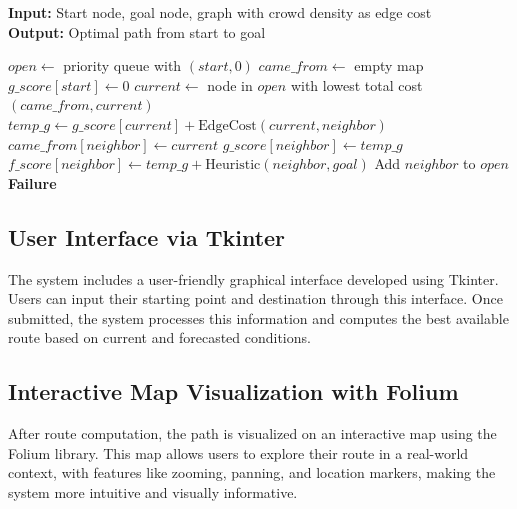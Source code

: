\begin{algorithm}[H]
\caption{A* Algorithm with Density Cost}
\label{alg:a_star}
\textbf{Input:} Start node, goal node, graph with crowd density as edge cost\\
\textbf{Output:} Optimal path from start to goal
\begin{algorithmic}[1]
    \State $open \gets$ priority queue with $(start, 0)$
    \State $came\_from \gets$ empty map
    \State $g\_score[start] \gets 0$
        \State $current \gets$ node in $open$ with lowest total cost
            \State \Return {}$(came\_from, current)$
        \EndIf
            \State $temp\_g \gets g\_score[current] + \text{EdgeCost}(current, neighbor)$
                \State $came\_from[neighbor] \gets current$
                \State $g\_score[neighbor] \gets temp\_g$
                \State $f\_score[neighbor] \gets temp\_g + \text{Heuristic}(neighbor, goal)$
                \State Add $neighbor$ to $open$
            \EndIf
        \EndFor
    \EndWhile
    \State \Return \textbf{Failure}
\EndFunction
\end{algorithmic}
\end{algorithm}

\subsection{User Interface via Tkinter}

The system includes a user-friendly graphical interface developed using Tkinter. Users can input their starting point and destination through this interface. Once submitted, the system processes this information and computes the best available route based on current and forecasted conditions.

\subsection{Interactive Map Visualization with Folium}

After route computation, the path is visualized on an interactive map using the Folium library. This map allows users to explore their route in a real-world context, with features like zooming, panning, and location markers, making the system more intuitive and visually informative.



